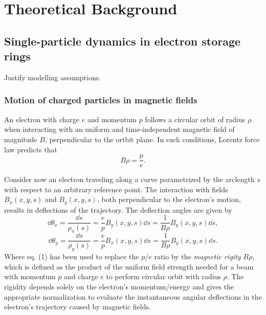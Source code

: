 \chapter{Theoretical Background}
\section{Single-particle dynamics in electron storage rings}
Justify modelling assumptions.
\subsection{Motion of charged particles in magnetic fields}
An electron with charge $e$ and momentum $p$ follows a circular orbit of radius $\rho$ when interacting with an uniform and time-independent magnetic field of magnitude $B$, perpendicular to the ortbit plane. In such conditions, Lorentz force law predicts that
\begin{equation}
    B\rho = \frac{p}{e}.
\end{equation}

Consider now an electron traveling along a curve parametrized by the arclength $s$ with respect to an arbitrary reference point. The interaction with fields $B_x(x,y,s)$  and $B_y(x,y,s)$, both perpendicular to the electron's motion, results in deflections of the trajectory. The deflection angles are given by
    \begin{equation}
    \dd{\theta_x} = \frac{\dd{s}}{\rho_x(s)} = \frac{e}{p}B_y(x,y,s)\dd s = \frac{1}{B\rho}B_y(x,y,s)\dd s,
    \end{equation}
    \begin{equation}
        \dd{\theta_y} = \frac{\dd{s}}{\rho_y(s)} = \frac{e}{p}B_x(x,y,s)\dd s = \frac{1}{B\rho}B_y(x,y,s)\dd s.
    \end{equation}
Where eq. (1) has been used to replace the $p/e$ ratio by the \textit{magnetic rigity} $B\rho$, which is defined as the product of the uniform field strength needed for a beam with momentum $p$ and charge $e$ to perform circular orbit with radius $\rho$. The rigidity depends solely on the electron's momentum/energy and gives the appropriate normalization to evaluate the instantaneous angular deflections in the electron's trajectory caused by magnetic fields.


